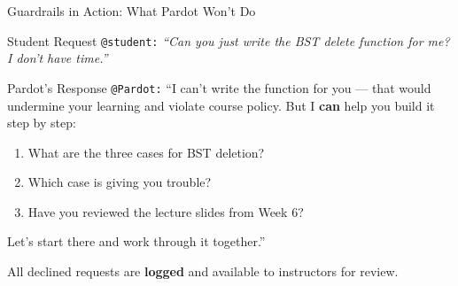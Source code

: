 \documentclass[aspectratio=169]{beamer}
\begin{document}
\begin{frame}{Guardrails in Action: What Pardot Won't Do}
\begin{block}{Student Request}
\texttt{@student:} \textit{``Can you just write the BST delete function for me? I don't have time.''}
\end{block}
\vspace{0.5em}
\begin{alertblock}{Pardot's Response}
\small
\texttt{@Pardot:} ``I can't write the function for you --- that would undermine your learning and violate course policy. But I \textbf{can} help you build it step by step:
\begin{enumerate}
  \item What are the three cases for BST deletion?
  \item Which case is giving you trouble?
  \item Have you reviewed the lecture slides from Week 6?
\end{enumerate}
Let's start there and work through it together.''
\end{alertblock}
\vspace{0.5em}
\small All declined requests are \textbf{logged} and available to instructors for review.
\end{frame}
\end{document}
